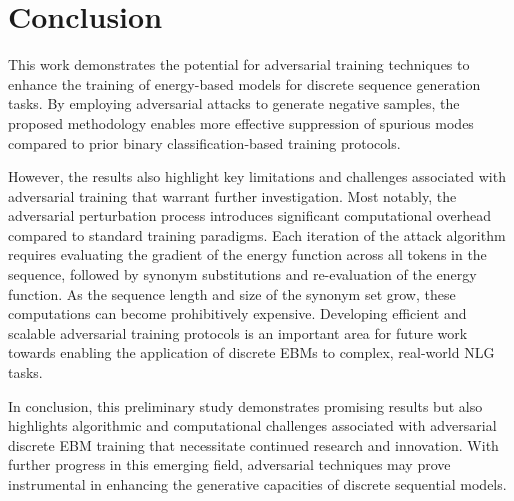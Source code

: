 \documentclass{article}
\begin{document}
\section{Conclusion}

This work demonstrates the potential for adversarial training techniques to enhance the training of energy-based models for discrete sequence generation tasks. By employing adversarial attacks to generate negative samples, the proposed methodology enables more effective suppression of spurious modes compared to prior binary classification-based training protocols.

However, the results also highlight key limitations and challenges associated with adversarial training that warrant further investigation. Most notably, the adversarial perturbation process introduces significant computational overhead compared to standard training paradigms. Each iteration of the attack algorithm requires evaluating the gradient of the energy function across all tokens in the sequence, followed by synonym substitutions and re-evaluation of the energy function. As the sequence length and size of the synonym set grow, these computations can become prohibitively expensive.
Developing efficient and scalable adversarial training protocols is an important area for future work towards enabling the application of discrete EBMs to complex, real-world NLG tasks.

In conclusion, this preliminary study demonstrates promising results but also highlights algorithmic and computational challenges associated with adversarial discrete EBM training that necessitate continued research and innovation. With further progress in this emerging field, adversarial techniques may prove instrumental in enhancing the generative capacities of discrete sequential models.



\end{document}
